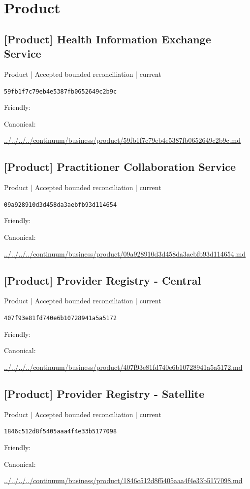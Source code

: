 \documentclass[10pt,a4paper]{article}
\begin{document}
\section*{Product}
\subsection*{[Product] Health Information Exchange Service}
{\small Product | Accepted bounded reconciliation | current}\par
\texttt{59fb1f7c79eb4e5387fb0652649c2b9c}\par
Friendly: \par
Canonical: \par
{\footnotesize\url{../../../../continuum/business/product/59fb1f7c79eb4e5387fb0652649c2b9c.md}}\par
\subsection*{[Product] Practitioner Collaboration Service}
{\small Product | Accepted bounded reconciliation | current}\par
\texttt{09a928910d3d458da3aebfb93d114654}\par
Friendly: \par
Canonical: \par
{\footnotesize\url{../../../../continuum/business/product/09a928910d3d458da3aebfb93d114654.md}}\par
\subsection*{[Product] Provider Registry - Central}
{\small Product | Accepted bounded reconciliation | current}\par
\texttt{407f93e81fd740e6b10728941a5a5172}\par
Friendly: \par
Canonical: \par
{\footnotesize\url{../../../../continuum/business/product/407f93e81fd740e6b10728941a5a5172.md}}\par
\subsection*{[Product] Provider Registry - Satellite}
{\small Product | Accepted bounded reconciliation | current}\par
\texttt{1846c512d8f5405aaa4f4e33b5177098}\par
Friendly: \par
Canonical: \par
{\footnotesize\url{../../../../continuum/business/product/1846c512d8f5405aaa4f4e33b5177098.md}}\par
\end{document}
